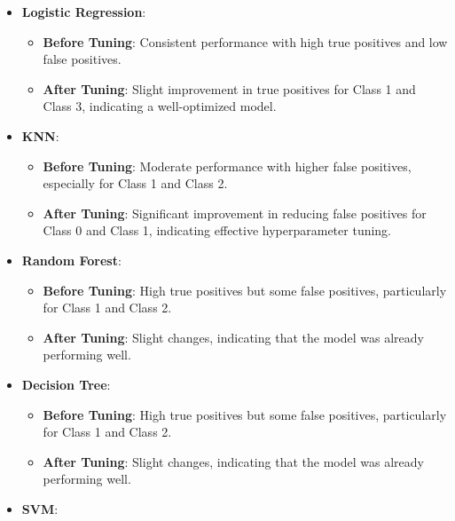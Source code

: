 \documentclass[12pt]{report}
\begin{document}
\vspace{-1.25em}
\begin{itemize}
	\setlength\itemsep{-1.5em}
		\item \textbf{Logistic Regression}:
		\vspace{-1.25em}	
		\begin{itemize}
					\setlength\itemsep{-1.5em}
					\item \textbf{Before Tuning}: Consistent performance with high true positives and low false positives.
					\item \textbf{After Tuning}: Slight improvement in true positives for Class 1 and Class 3, indicating a well-optimized model.
			\end{itemize}
		\item \textbf{KNN}:
		\vspace{-1.25em}	
		\begin{itemize}
					\setlength\itemsep{-1.5em}
					\item \textbf{Before Tuning}: Moderate performance with higher false positives, especially for Class 1 and Class 2.
					\item \textbf{After Tuning}: Significant improvement in reducing false positives for Class 0 and Class 1, indicating effective hyperparameter tuning.
				\end{itemize}
		\item \textbf{Random Forest}:
		\vspace{-1.25em}	
		\begin{itemize}
				\setlength\itemsep{-1.5em}
        \item \textbf{Before Tuning}: High true positives but some false positives, particularly for Class 1 and Class 2.
        \item \textbf{After Tuning}: Slight changes, indicating that the model was already performing well.
			\end{itemize}
		\item \textbf{Decision Tree}:
		\vspace{-1.25em}	
		\begin{itemize}
				\setlength\itemsep{-1.5em}
        \item \textbf{Before Tuning}: High true positives but some false positives, particularly for Class 1 and Class 2.
        \item \textbf{After Tuning}: Slight changes, indicating that the model was already performing well.
			\end{itemize}
		\item \textbf{SVM}:

\end{itemize}
\end{document}
